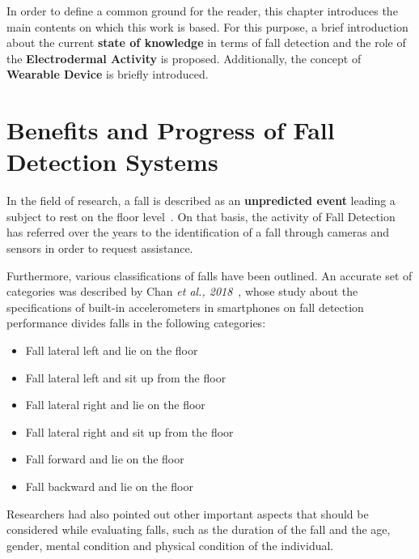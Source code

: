 \label{ch:background}

In order to define a common ground for the reader, this chapter introduces the main contents on which this work is based. For this purpose, a brief introduction about the current \textbf{state of knowledge} in terms of fall detection and the role of the \textbf{Electrodermal Activity} is proposed. Additionally, the concept of \textbf{Wearable Device} is briefly introduced.

\section{Benefits and Progress of Fall Detection Systems }\label{sec:sectionname}

In the field of research, a fall is described as an \textbf{unpredicted event} leading a subject to rest on the floor level~\cite{Lamb1}. On that basis, the activity of Fall Detection has referred over the years to the identification of a fall through cameras and sensors in order to request assistance.

Furthermore, various classifications of falls have been outlined. An accurate set of categories was described by Chan \textit{et al., 2018}~\cite{Chen1}, whose study about the specifications of built-in accelerometers in smartphones on fall detection performance divides falls in the following categories: 

\begin{itemize}
    \item Fall lateral left and lie on the floor
    \item Fall lateral left and sit up from the floor
    \item Fall lateral right and lie on the floor
    \item Fall lateral right and sit up from the floor
    \item Fall forward and lie on the floor
    \item Fall backward and lie on the floor
\end{itemize}

Researchers had also pointed out other important aspects that should be considered while evaluating falls, such as the duration of the fall and the age, gender, mental condition and physical condition of the individual.


